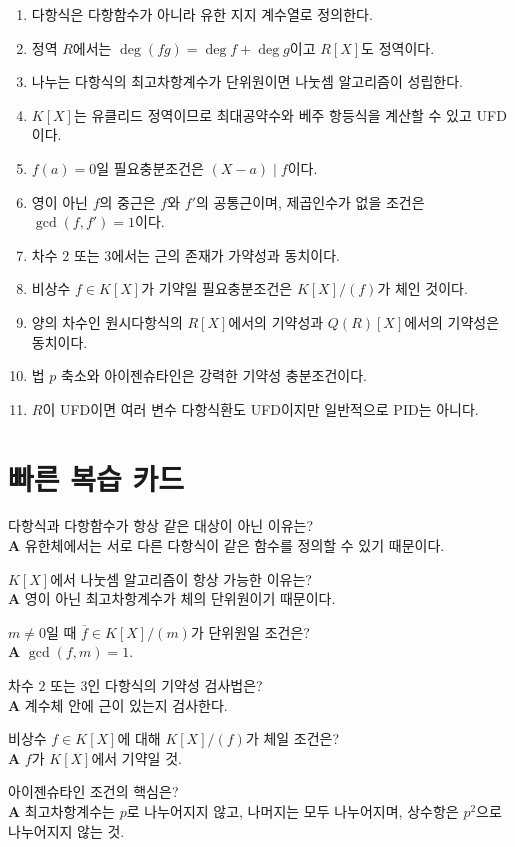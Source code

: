 \begin{chapterreview}
\begin{enumerate}
  \item 다항식은 다항함수가 아니라 유한 지지 계수열로 정의한다.
  \item 정역 $R$에서는 $\deg(fg)=\deg f+\deg g$이고 $R[X]$도 정역이다.
  \item 나누는 다항식의 최고차항계수가 단위원이면 나눗셈 알고리즘이 성립한다.
  \item $K[X]$는 유클리드 정역이므로 최대공약수와 베주 항등식을 계산할 수 있고 UFD이다.
  \item $f(a)=0$일 필요충분조건은 $(X-a)\mid f$이다.
  \item 영이 아닌 $f$의 중근은 $f$와 $f'$의 공통근이며, 제곱인수가 없을 조건은 $\gcd(f,f')=1$이다.
  \item 차수 $2$ 또는 $3$에서는 근의 존재가 가약성과 동치이다.
  \item 비상수 $f\in K[X]$가 기약일 필요충분조건은 $K[X]/(f)$가 체인 것이다.
  \item 양의 차수인 원시다항식의 $R[X]$에서의 기약성과 $Q(R)[X]$에서의 기약성은 동치이다.
  \item 법 $p$ 축소와 아이젠슈타인은 강력한 기약성 충분조건이다.
  \item $R$이 UFD이면 여러 변수 다항식환도 UFD이지만 일반적으로 PID는 아니다.
\end{enumerate}
\end{chapterreview}

\section{빠른 복습 카드}

\begin{description}[style=nextline]
  \item[Q] 다항식과 다항함수가 항상 같은 대상이 아닌 이유는?\\
  \textbf{A} 유한체에서는 서로 다른 다항식이 같은 함수를 정의할 수 있기 때문이다.

  \item[Q] $K[X]$에서 나눗셈 알고리즘이 항상 가능한 이유는?\\
  \textbf{A} 영이 아닌 최고차항계수가 체의 단위원이기 때문이다.

  \item[Q] $m\ne0$일 때 $\overline f\in K[X]/(m)$가 단위원일 조건은?\\
  \textbf{A} $\gcd(f,m)=1$.

  \item[Q] 차수 $2$ 또는 $3$인 다항식의 기약성 검사법은?\\
  \textbf{A} 계수체 안에 근이 있는지 검사한다.

  \item[Q] 비상수 $f\in K[X]$에 대해 $K[X]/(f)$가 체일 조건은?\\
  \textbf{A} $f$가 $K[X]$에서 기약일 것.

  \item[Q] 아이젠슈타인 조건의 핵심은?\\
  \textbf{A} 최고차항계수는 $p$로 나누어지지 않고, 나머지는 모두 나누어지며, 상수항은 $p^2$으로 나누어지지 않는 것.
\end{description}

